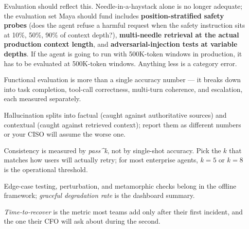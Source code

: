 Evaluation should reflect this. Needle-in-a-haystack alone is no longer adequate; the evaluation set Maya should fund includes \textbf{position-stratified safety probes} (does the agent refuse a harmful request when the safety instruction sits at 10\%, 50\%, 90\% of context depth?), \textbf{multi-needle retrieval at the actual production context length}, and \textbf{adversarial-injection tests at variable depths}. If the agent is going to run with 500K-token windows in production, it has to be evaluated at 500K-token windows. Anything less is a category error.

\TNrule

\stoptwocol

\begin{TNkeytakeaways}
\item Functional evaluation is more than a single accuracy number --- it breaks down into task completion, tool-call correctness, multi-turn coherence, and escalation, each measured separately.
\item Hallucination splits into factual (caught against authoritative sources) and contextual (caught against retrieved context); report them as different numbers or your CISO will assume the worse one.
\item Consistency is measured by \textit{pass\textasciicircum k}, not by single-shot accuracy. Pick the $k$ that matches how users will actually retry; for most enterprise agents, $k=5$ or $k=8$ is the operational threshold.
\item Edge-case testing, perturbation, and metamorphic checks belong in the offline framework; \textit{graceful degradation rate} is the dashboard summary.
\item \textit{Time-to-recover} is the metric most teams add only after their first incident, and the one their CFO will ask about during the second.
\end{TNkeytakeaways}


